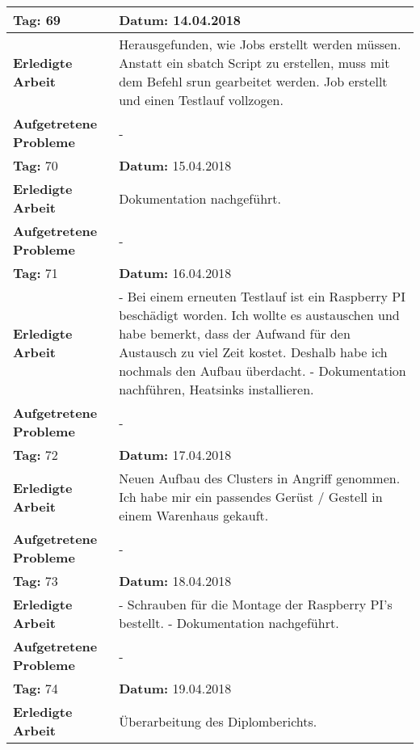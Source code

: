 \begin{longtable}{|p{5cm}|p{5cm}p{6cm}|}
\rowcolor{heading}\textbf{Tag:} 69 & \textbf{Datum:} 14.04.2018 & \\ \hline
\textbf{Erledigte Arbeit} & \multicolumn{2}{p{11cm}|}{Herausgefunden, wie Jobs erstellt werden müssen. Anstatt ein sbatch Script zu erstellen, muss mit dem Befehl srun gearbeitet werden. Job erstellt und einen Testlauf vollzogen.} \\ \hline
\textbf{Aufgetretene Probleme} & \multicolumn{2}{p{11cm}|}{-} \\ \hline
\rowcolor{heading}\textbf{Tag:} 70 & \textbf{Datum:} 15.04.2018 & \\ \hline
\textbf{Erledigte Arbeit} & \multicolumn{2}{p{11cm}|}{Dokumentation nachgeführt.} \\ \hline
\textbf{Aufgetretene Probleme} & \multicolumn{2}{p{11cm}|}{-} \\ \hline
\rowcolor{heading}\textbf{Tag:} 71 & \textbf{Datum:} 16.04.2018 & \\ \hline
\textbf{Erledigte Arbeit} & \multicolumn{2}{p{11cm}|}{- Bei einem erneuten Testlauf ist ein Raspberry PI beschädigt worden. Ich wollte es austauschen und habe bemerkt, dass der Aufwand für den Austausch zu viel Zeit kostet. Deshalb habe ich nochmals den Aufbau überdacht. \newline 
- Dokumentation nachführen, Heatsinks installieren.} \\ \hline
\textbf{Aufgetretene Probleme} & \multicolumn{2}{p{11cm}|}{-} \\ \hline
\rowcolor{heading}\textbf{Tag:} 72 & \textbf{Datum:} 17.04.2018 & \\ \hline
\textbf{Erledigte Arbeit} & \multicolumn{2}{p{11cm}|}{Neuen Aufbau des Clusters in Angriff genommen. Ich habe mir ein passendes Gerüst / Gestell in einem Warenhaus gekauft. } \\ \hline
\textbf{Aufgetretene Probleme} & \multicolumn{2}{p{11cm}|}{-} \\ \hline
\rowcolor{heading}\textbf{Tag:} 73 & \textbf{Datum:} 18.04.2018 & \\ \hline
\textbf{Erledigte Arbeit} & \multicolumn{2}{p{11cm}|}{- Schrauben für die Montage der Raspberry PI's bestellt. \newline
- Dokumentation nachgeführt.} \\ \hline
\textbf{Aufgetretene Probleme} & \multicolumn{2}{p{11cm}|}{-} \\ \hline
\rowcolor{heading}\textbf{Tag:} 74 & \textbf{Datum:} 19.04.2018 & \\ \hline
\textbf{Erledigte Arbeit} & \multicolumn{2}{p{11cm}|}{Überarbeitung des Diplomberichts.} \\ \hline

\end{longtable}

